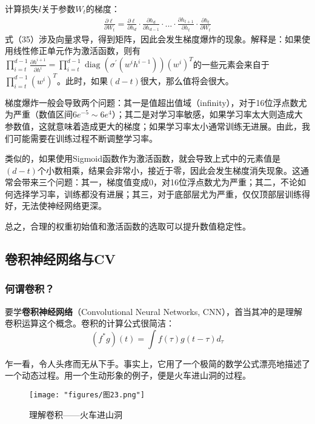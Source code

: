 计算损失$l$关于参数$W_{t}$的梯度：
\begin{equation}\begin{aligned}\frac{\partial\ell}{\partial W_t}=\frac{\partial\ell}{\partial h_d}\cdot\frac{\partial h_d}{\partial h_{d-1}}\cdot...\cdot\frac{\partial h_{t+1}}{\partial h_t}\cdot\frac{\partial h_t}{\partial W_t}\end{aligned}\end{equation}
式（35）涉及向量求导，得到矩阵，因此会发生梯度爆炸的现象。解释是：如果使用线性修正单元作为激活函数，则有$\prod_{i=t}^{d-1}\frac{\partial h^{i+1}}{\partial h^{i}}=\prod_{i=t}^{d-1}\operatorname{diag}\left(\sigma^{\prime}(w^{i}h^{i-1})\right)(w^{i})^{T}$的一些元素会来自于$\prod_{i=t}^{d-1}(w^{i})^{T}$。此时，如果$(d-t)$很大，那么值将会很大。

梯度爆炸一般会导致两个问题：其一是值超出值域（infinity），对于16位浮点数尤为严重（数值区间$6e^{-5}{\sim}6e^{ 4}$）；其二是对学习率敏感，如果学习率太大则造成大参数值，这就意味着造成更大的梯度；如果学习率太小通常训练无进展。由此，我们可能需要在训练过程不断调整学习率。

类似的，如果使用Sigmoid函数作为激活函数，就会导致上式中的元素值是$(d-t)$个小数相乘，结果会非常小，接近于零，因此会发生梯度消失现象。这通常会带来三个问题：其一，梯度值变成0，对16位浮点数尤为严重；其二，不论如何选择学习率，训练都没有进展；其三，对于底部层尤为严重，仅仅顶部层训练得好，无法使神经网络更深。

总之，合理的权重初始值和激活函数的选取可以提升数值稳定性。

\subsection{卷积神经网络与CV}
\subsubsection{何谓卷积？}
要学\textbf{卷积神经网络}（Convolutional Neural Networks, CNN），首当其冲的是理解卷积运算这个概念。卷积的计算公式很简洁：
\begin{equation}\left(f^*g\right)\left(t\right)=\int f\left(\tau\right)g\left(t-\tau\right)d_\tau \end{equation}

乍一看，令人头疼而无从下手。事实上，它用了一个极简的数学公式漂亮地描述了一个动态过程。用一个生动形象的例子，便是火车进山洞的过程。
\begin{figure}[ht] %
	\centering
	\texttt{[image: "figures/图23.png"]} %
	\caption{理解卷积——火车进山洞} %
	\label{fig:example} %
\end{figure}

